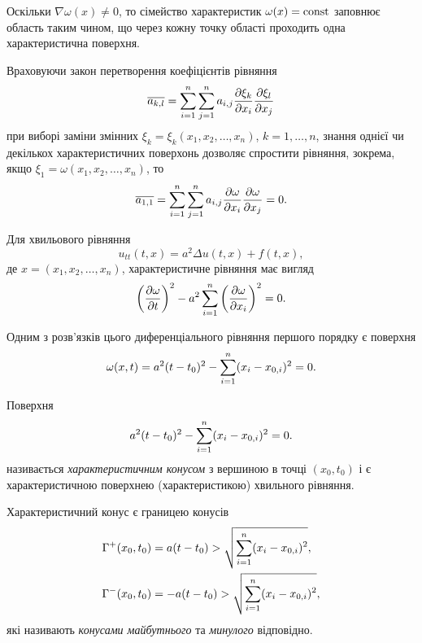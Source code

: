 Оскільки $\nabla \omega(x) \ne 0$, то сімейство характеристик $\omega(x) = \operatorname{const}$ заповнює область таким чином, що через кожну точку області проходить одна характеристична поверхня. \medskip

Враховуючи закон перетворення коефіцієнтів рівняння
\begin{equation}
    \overline{a_{k, l}} = \displaystyle\sum\limits_{i = 1}^n \displaystyle\sum\limits_{j = 1}^n a_{i, j} \frac{\partial \xi_k}{\partial x_i} \frac{\partial \xi_l}{\partial x_j}
\end{equation}
при виборі заміни змінних $\xi_k = \xi_k(x_1, x_2, \ldots, x_n)$, $k = 1, \ldots, n$, знання однієї чи декількох характеристичних поверхонь дозволяє спростити рівняння, зокрема, якщо $\xi_1 = \omega(x_1, x_2, \ldots, x_n)$, то
\begin{equation}
    \overline{a_{1, 1}} = \displaystyle\sum\limits_{i = 1}^n \displaystyle\sum\limits_{j = 1}^n a_{i, j} \frac{\partial \omega}{\partial x_i} \frac{\partial \omega}{\partial x_j} = 0.
\end{equation}

Для хвильового рівняння
\begin{equation}
    u_{tt}(t, x) = a^2 \Delta u(t, x) + f(t, x),
\end{equation}
де $x = (x_1, x_2, \ldots, x_n)$, характеристичне рівняння має вигляд
\begin{equation}
    \left( \frac{\partial \omega}{\partial t} \right)^2 - a^2 \displaystyle\sum\limits_{i = 1}^n \left(\frac{\partial \omega}{\partial x_i} \right)^2 = 0.
\end{equation}

Одним з розв'язків цього диференціального рівняння першого порядку є поверхня
\begin{equation}
    \omega(x, t) = a^2 (t - t_0)^2 - \displaystyle\sum\limits_{i = 1}^n (x_i - x_{0, i})^2 = 0.
\end{equation}

\begin{definition}
    Поверхня
    \begin{equation}
        a^2 (t - t_0)^2 - \displaystyle\sum\limits_{i = 1}^n (x_i - x_{0, i})^2 = 0.
    \end{equation}
    називається \textit{характеристичним конусом} з вершиною в точці $(x_0, t_0)$ і є характеристичною поверхнею (характеристикою) хвильного рівняння.
\end{definition}

\begin{remark}
    Характеристичний конус є границею конусів
    \begin{align}
        \Gamma^+(x_0, t_0) &= a (t - t_0) > \sqrt{ \displaystyle\sum\limits_{i = 1}^n (x_i - x_{0, i})^2 }, \\
        \Gamma^-(x_0, t_0) &= - a (t - t_0) > \sqrt{ \displaystyle\sum\limits_{i = 1}^n (x_i - x_{0, i})^2 },
    \end{align}
    які називають \textit{конусами майбутнього} та \textit{минулого} відповідно.
\end{remark}

